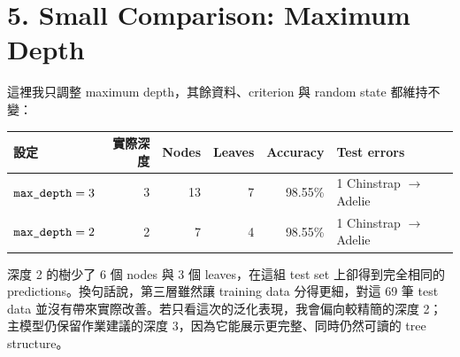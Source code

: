 \section*{5. Small Comparison: Maximum Depth}
\sectionrule

這裡我只調整 maximum depth，其餘資料、criterion 與 random state 都維持不變：

\begin{table}[H]
\centering
\small
\begin{tabularx}{\linewidth}{lrrrrY}
\toprule
\textbf{設定} & \textbf{實際深度} & \textbf{Nodes} & \textbf{Leaves} & \textbf{Accuracy} & \textbf{Test errors} \\
\midrule
$\texttt{max\_depth}=3$ & 3 & 13 & 7 & 98.55\% & 1 Chinstrap $\rightarrow$ Adelie \\
$\texttt{max\_depth}=2$ & 2 & 7 & 4 & 98.55\% & 1 Chinstrap $\rightarrow$ Adelie \\
\bottomrule
\end{tabularx}
\end{table}

深度 2 的樹少了 6 個 nodes 與 3 個 leaves，在這組 test set 上卻得到完全相同的 predictions。換句話說，第三層雖然讓 training data 分得更細，對這 69 筆 test data 並沒有帶來實際改善。若只看這次的泛化表現，我會偏向較精簡的深度 2；主模型仍保留作業建議的深度 3，因為它能展示更完整、同時仍然可讀的 tree structure。
